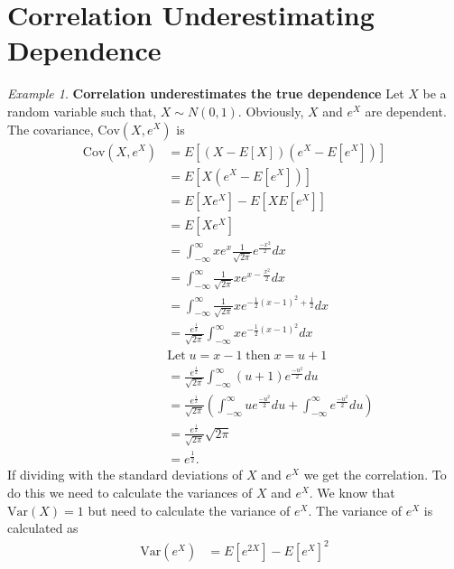 \documentclass[%
a4paper,							
11pt,								
bibliography=totoc,						
abstracton=true					
]
{scrartcl}
\theoremstyle{plain}
\theoremstyle{definition}
\theoremstyle{remark}
\newtheorem{example}[theorem]{Example}
\newcommand{\1}{\mathbbm{1}}
\begin{document}
\section{Correlation Underestimating Dependence }\label{sec:CorrelationUnderestimatesAppendix}
\begin{example} 
    \textbf{Correlation underestimates the true dependence} 
    Let $X$ be a random variable such that, $X \sim N(0,1)$. Obviously, $X$ and $e^X$ are dependent. The covariance, $\mathrm{Cov}(X,e^X)$ is
    \begin{align*}
        \mathrm{Cov}(X,e^X) &= E \left[  (X-E\left[  X \right])(e^X-E\left[  e^X \right])  \right]\\
         &=  E \left[  X(e^X-E\left[  e^X \right]) \right]\\
         &= E \left[  Xe^X  \right] - E \left[  X E \left[  e^X \right] \right]\\
         &= E \left[  Xe^X  \right]\\
         &= \int_{-\infty}^\infty xe^x \frac{1}{\sqrt{2\pi}} e^{\frac{-x^2}{2}} dx\\ %
         &=  \int_{-\infty}^\infty \frac{1}{\sqrt{2\pi}} x  e^{x -\frac{x^2}{2}} dx \\
         &= \int_{-\infty}^\infty \frac{1}{\sqrt{2\pi}} x  e^{-\frac{1}{2}(x-1)^2+\frac{1}{2} } dx \\
         &= \frac{e^\frac{1}{2}}{\sqrt{2\pi}}\int_{-\infty}^\infty x  e^{-\frac{1}{2}(x-1)^2 } dx\\
         & \mathrm{Let\;} u = x-1 \; \mathrm{then\;} x = u+1\\
         &= \frac{e^\frac{1}{2}}{\sqrt{2\pi}}\int_{-\infty}^\infty (u+1)e^{\frac{-u^2}{2}} du\\
         &= \frac{e^\frac{1}{2}}{\sqrt{2\pi}} \left( \int_{-\infty}^\infty ue^{\frac{-u^2}{2}}du +\int_{-\infty}^\infty e^{\frac{-u^2}{2}} du  \right) \\
         &= \frac{e^\frac{1}{2}}{\sqrt{2\pi}}\sqrt{2\pi}   \\
         &= e^{\frac{1}{2}}.
    \end{align*}
    If dividing with the standard deviations of $X$ and $e^X$ we get the correlation. To do this we need to calculate the variances of $X$ and $e^X$. We know that $\mathrm{Var}(X) = 1$ but need to calculate the variance of $e^X$. The variance of $e^X$ is calculated as
    \begin{align*}
        \mathrm{Var}(e^X) &= E[e^{2X}] - E[e^X]^2\\

\end{align*}
\end{example}
\end{document}
